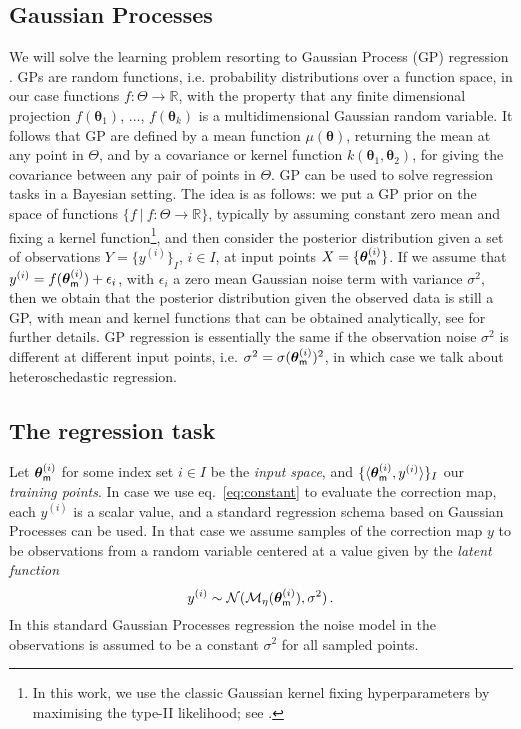 \documentclass[runningheads,a4paper]{llncs}
\newcommand{\bm}{{\sf{m}}}
\newcommand{\rarg}[1]{{\bth_{\bm}^{(#1)}}}
\newcommand{\tstat}{\eta} %
\newcommand{\tmap}{{{\cal M}_\tstat}}
\newcommand{\bth}{\boldsymbol{\theta}}
\begin{document}
\subsection{Gaussian Processes} We will solve the learning problem resorting to Gaussian Process (GP) regression \cite{RASMUSSEN}. GPs are random functions, i.e. probability distributions over a function space, in our case functions $f:\Theta\rightarrow\mathbb{R}$, with the property that any finite dimensional projection $f(\bth_1)$, $\ldots$, $f(\bth_k)$ is a multidimensional Gaussian random variable. It follows that GP are defined by a mean function $\mu(\bth)$, returning the mean at any point in $\Theta$, and by a covariance or kernel function $k(\bth_1,\bth_2)$, for giving the covariance between any pair of points in $\Theta$.  GP can be used to solve regression tasks in a Bayesian setting. The idea is as follows: we put a GP prior on  the space of functions $\{f~|~f:\Theta\rightarrow\mathbb{R}\}$, typically by assuming constant zero mean and fixing a kernel function\footnote{ In this work, we use the classic Gaussian kernel fixing  hyperparameters by maximising the type-II likelihood; see \cite{RASMUSSEN}.}, and then consider the posterior distribution given a set of observations $Y= \{ y^{(i)}\}_I$, $i \in I$, at input points $X = \{\bth_{\bm}^{(i)}\}$.   If we assume that $y^{(i)} = f(\bth_{\bm}^{(i)}) + \epsilon_i$, with $\epsilon_i$ a zero mean Gaussian noise term with variance $\sigma^2$, then we  obtain that the posterior distribution given the observed data is still a GP, with mean and kernel functions that can be obtained analytically, see \cite{RASMUSSEN} for further details. GP regression is essentially the same if the observation noise $\sigma^2$ is different at different input points, i.e. $\sigma^2 = \sigma(\rarg{i} )^2$, in which case we talk about heteroschedastic regression. 

\subsection{The regression task}

Let  ${\bth_{\bm}^{(i)}}$ for some index set $i \in I$ be the {\em input space}, and  $\{ \langle {\bth_{\bm}^{(i)}}, y^{(i)}\rangle\}_I$  our {\em training points}.   In case we use eq.~\eqref{eq:constant} to evaluate the correction map,  each $y^{(i)}$ is a scalar  value, and a standard regression schema based on Gaussian Processes can be used. In that case we assume samples of the correction map $y$ to be observations from a random variable centered at a value given by the {\em latent function}
\begin{equation}\label{eq:reg}
y^{(i)} \sim {\cal N} (\tmap(\rarg{i}),    \sigma^2) \, .
\end{equation}
In this standard  Gaussian Processes regression the noise model in the observations is assumed to be a constant $\sigma^2$ for all sampled points.
\end{document}
